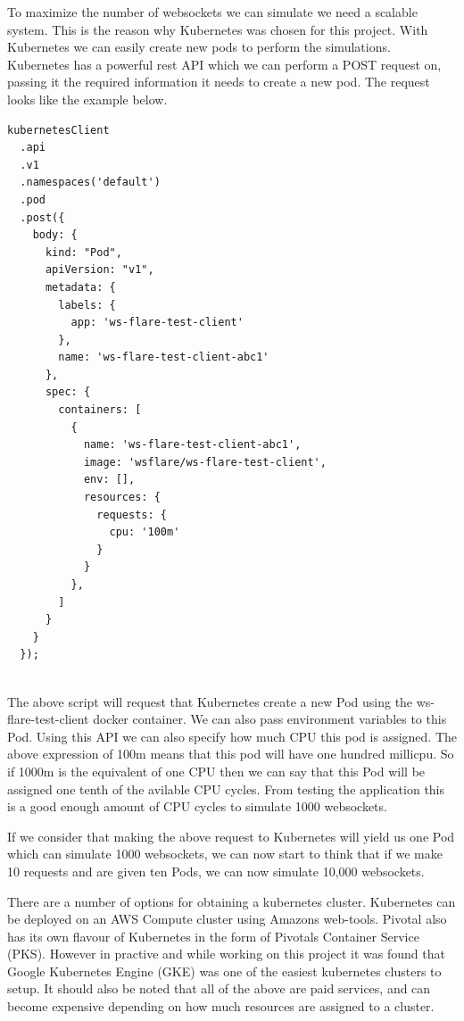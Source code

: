 To maximize the number of websockets we can simulate we need a scalable system. This is the reason why Kubernetes was chosen for this project. With Kubernetes we can easily create new pods to perform the simulations. Kubernetes has a powerful rest API which we can perform a POST request on, passing it the required information it needs to create a new pod. The request looks like the example below.

\begin{verbatim}
kubernetesClient
  .api
  .v1
  .namespaces('default')
  .pod
  .post({
    body: {
      kind: "Pod",
      apiVersion: "v1",
      metadata: {
        labels: {
          app: 'ws-flare-test-client'
        },
        name: 'ws-flare-test-client-abc1'
      },
      spec: {
        containers: [
          {
            name: 'ws-flare-test-client-abc1',
            image: 'wsflare/ws-flare-test-client',
            env: [],
            resources: {
              requests: {
                cpu: '100m'
              }
            }
          },
        ]
      }
    }
  });
  
\end{verbatim}

The above script will request that Kubernetes create a new Pod using the ws-flare-test-client docker container. We can also pass environment variables to this Pod. Using this API we can also specify how much CPU this pod is assigned. The above expression of 100m means that this pod will have one hundred millicpu. So if 1000m is the equivalent of one CPU then we can say that this Pod will be assigned one tenth of the avilable CPU cycles. From testing the application this is a good enough amount of CPU cycles to simulate 1000 websockets. 

If we consider that making the above request to Kubernetes will yield us one Pod which can simulate 1000 websockets, we can now start to think that if we make 10 requests and are given ten Pods, we can now simulate 10,000 websockets.

There are a number of options for obtaining a kubernetes cluster. Kubernetes can be deployed on an AWS Compute cluster using Amazons web-tools. Pivotal also has its own flavour of Kubernetes in the form of Pivotals Container Service (PKS). However in practive and while working on this project it was found that Google Kubernetes Engine (GKE) was one of the easiest kubernetes clusters to setup. It should also be noted that all of the above are paid services, and can become expensive depending on how much resources are assigned to a cluster. 

